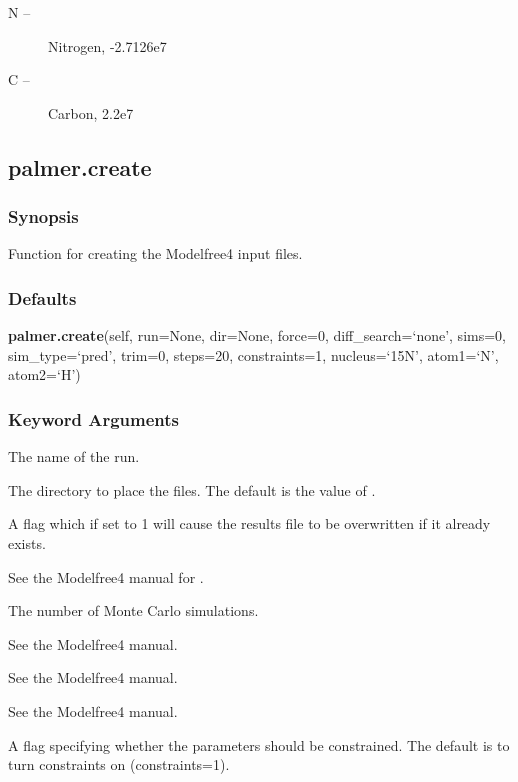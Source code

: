 \begin{description}
\item[N --]  Nitrogen, -2.7126e7 
\item[C --]  Carbon, 2.2e7 
\end{description}




\newpage

\subsection{palmer.create}


\subsubsection{Synopsis}

Function for creating the Modelfree4 input files.



\subsubsection{Defaults}

\textsf{\textbf{palmer.create}(self, run=None, dir=None, force=0, diff\_search=`none', sims=0, sim\_type=`pred', trim=0, steps=20, constraints=1, nucleus=`15N', atom1=`N', atom2=`H')}


\subsubsection{Keyword Arguments}

  The name of the run. 

  The directory to place the files.  The default is the value of . 

  A flag which if set to 1 will cause the results file to be overwritten if it already exists. 

  See the Modelfree4 manual for . 

  The number of Monte Carlo simulations. 

  See the Modelfree4 manual. 

  See the Modelfree4 manual. 

  See the Modelfree4 manual. 

  A flag specifying whether the parameters should be constrained.  The default is to turn constraints on (constraints=1). 

